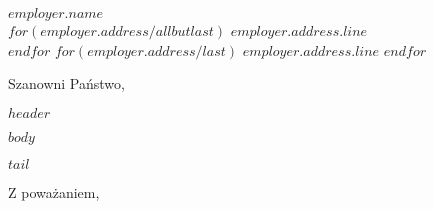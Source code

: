\documentclass[11pt,a4paper]{letter}
\begin{document}
 
\begin{letter}{$employer.name$ \\ $for(employer.address/allbutlast)$ $employer.address.line$ \\ $endfor$ $for(employer.address/last)$ $employer.address.line$ $endfor$} 
\opening{Szanowni Państwo,} 

$header$

$body$

$tail$

\closing{Z poważaniem,\\
 \\
}
 
\end{letter} 
\end{document}
